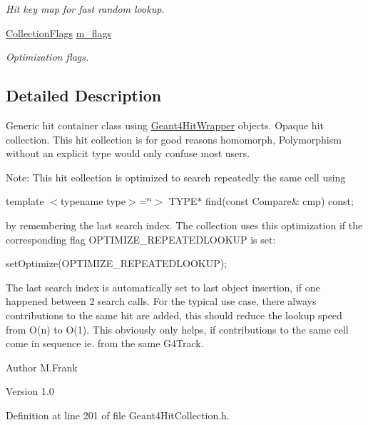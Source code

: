 \begin{DoxyCompactItemize}
\begin{DoxyCompactList}\small\item\em Hit key map for fast random lookup. \item\end{DoxyCompactList}\item 
\hyperlink{union_d_d4hep_1_1_simulation_1_1_geant4_hit_collection_1_1_collection_flags}{CollectionFlags} \hyperlink{class_d_d4hep_1_1_simulation_1_1_geant4_hit_collection_a9c557501c37d783cbc1be1443aef03a9}{m\_\-flags}
\begin{DoxyCompactList}\small\item\em Optimization flags. \item\end{DoxyCompactList}\end{DoxyCompactItemize}


\subsection{Detailed Description}
Generic hit container class using \hyperlink{class_d_d4hep_1_1_simulation_1_1_geant4_hit_wrapper}{Geant4HitWrapper} objects. Opaque hit collection. This hit collection is for good reasons homomorph, Polymorphism without an explicit type would only confuse most users.

Note: This hit collection is optimized to search repeatedly the same cell using

template $<$typename type$>$=\char`\"{}\char`\"{}$>$ TYPE$\ast$ find(const Compare\& cmp) const;

by remembering the last search index. The collection uses this optimization if the corresponding flag OPTIMIZE\_\-REPEATEDLOOKUP is set:

setOptimize(OPTIMIZE\_\-REPEATEDLOOKUP);

The last search index is automatically set to last object insertion, if one happened between 2 search calls. For the typical use case, there always contributions to the same hit are added, this should reduce the lookup speed from O(n) to O(1). This obviously only helps, if contributions to the same cell come in sequence ie. from the same G4Track.

\begin{DoxyAuthor}{Author}
M.Frank 
\end{DoxyAuthor}
\begin{DoxyVersion}{Version}
1.0 
\end{DoxyVersion}


Definition at line 201 of file Geant4HitCollection.h.

